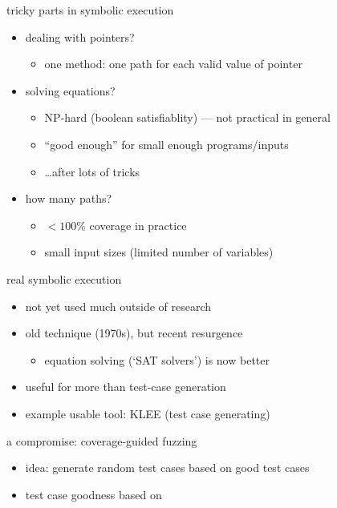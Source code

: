\begin{frame}{tricky parts in symbolic execution}
    \begin{itemize}
    \item dealing with pointers?
        \begin{itemize}
        \item one method: one path for each valid value of pointer
        \end{itemize}
    \item solving equations?
        \begin{itemize}
        \item NP-hard (boolean satisfiablity) --- not practical in general
        \item ``good enough'' for small enough programs/inputs
        \item \ldots after lots of tricks
        \end{itemize}
    \item how many paths?
        \begin{itemize}
        \item $<100\%$ coverage in practice
        \item small input sizes (limited number of variables)
        \end{itemize}
    \end{itemize}
\end{frame}

\begin{frame}{real symbolic execution}
    \begin{itemize}
    \item not yet used much outside of research
    \item old technique (1970s), but recent resurgence 
        \begin{itemize}
            \item equation solving (`SAT solvers') is now better
        \end{itemize}
    \item useful for more than test-case generation
    \vspace{.5cm}
\item example usable tool: KLEE (test case generating)
    \end{itemize}
\end{frame}

\begin{frame}{a compromise: coverage-guided fuzzing}
    \begin{itemize}
    \item idea: generate random test cases based on good test cases
    \item test case goodness based on 
    \end{itemize}
\end{frame}


